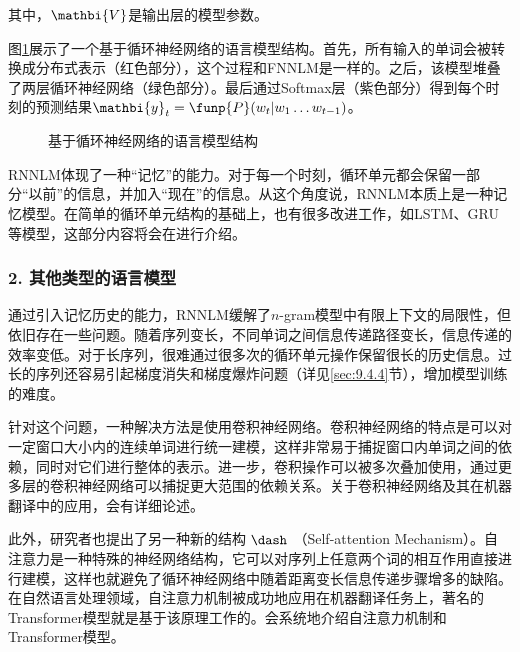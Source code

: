 \noindent  其中，${\mathbi{V}}$是输出层的模型参数。

\parinterval  图\ref{fig:9-62}展示了一个基于循环神经网络的语言模型结构。首先，所有输入的单词会被转换成分布式表示（红色部分），这个过程和FNNLM是一样的。之后，该模型堆叠了两层循环神经网络（绿色部分）。最后通过Softmax层（紫色部分）得到每个时刻的预测结果$ {\mathbi{y}}_t=\funp{P}(w_t|w_1\dots w_{t-1}) $。

\begin{figure}[htp]
\centering

\caption{基于循环神经网络的语言模型结构}
\label{fig:9-62}
\end{figure}

\parinterval  RNNLM体现了一种“记忆”的能力。对于每一个时刻，循环单元都会保留一部分“以前”的信息，并加入“现在”的信息。从这个角度说，RNNLM本质上是一种记忆模型。在简单的循环单元结构的基础上，也有很多改进工作，如LSTM、GRU等模型，这部分内容将会在{\chapterten}进行介绍。


\subsubsection{2. 其他类型的语言模型}\label{sec:9.5.2.2}

\parinterval  通过引入记忆历史的能力，RNNLM缓解了$n$-gram模型中有限上下文的局限性，但依旧存在一些问题。随着序列变长，不同单词之间信息传递路径变长，信息传递的效率变低。对于长序列，很难通过很多次的循环单元操作保留很长的历史信息。过长的序列还容易引起梯度消失和梯度爆炸问题（详见\ref{sec:9.4.4}节），增加模型训练的难度。

\parinterval  针对这个问题，一种解决方法是使用卷积神经网络。卷积神经网络的特点是可以对一定窗口大小内的连续单词进行统一建模，这样非常易于捕捉窗口内单词之间的依赖，同时对它们进行整体的表示。进一步，卷积操作可以被多次叠加使用，通过更多层的卷积神经网络可以捕捉更大范围的依赖关系。关于卷积神经网络及其在机器翻译中的应用，{\chaptereleven}会有详细论述。

\parinterval  此外，研究者也提出了另一种新的结构$\ \dash \ ${\small{}}（Self-attention Mechanism）。自注意力是一种特殊的神经网络结构，它可以对序列上任意两个词的相互作用直接进行建模，这样也就避免了循环神经网络中随着距离变长信息传递步骤增多的缺陷。在自然语言处理领域，自注意力机制被成功地应用在机器翻译任务上，著名的Transformer模型就是基于该原理工作的。{\chaptertwelve}会系统地介绍自注意力机制和Transformer模型。

